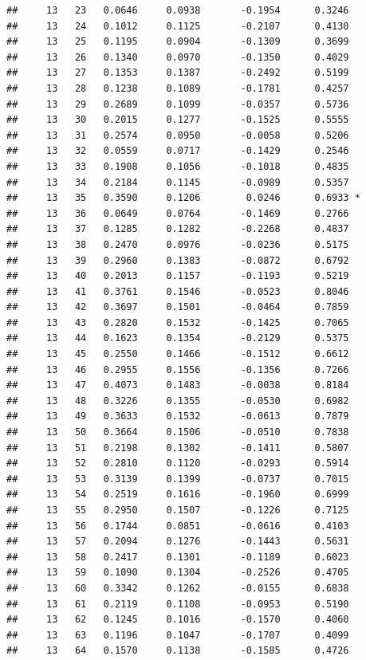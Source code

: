 \documentclass[
]{article}
\begin{document}
\begin{verbatim}
##     13   23   0.0646     0.0938       -0.1954      0.3246  
##     13   24   0.1012     0.1125       -0.2107      0.4130  
##     13   25   0.1195     0.0904       -0.1309      0.3699  
##     13   26   0.1340     0.0970       -0.1350      0.4029  
##     13   27   0.1353     0.1387       -0.2492      0.5199  
##     13   28   0.1238     0.1089       -0.1781      0.4257  
##     13   29   0.2689     0.1099       -0.0357      0.5736  
##     13   30   0.2015     0.1277       -0.1525      0.5555  
##     13   31   0.2574     0.0950       -0.0058      0.5206  
##     13   32   0.0559     0.0717       -0.1429      0.2546  
##     13   33   0.1908     0.1056       -0.1018      0.4835  
##     13   34   0.2184     0.1145       -0.0989      0.5357  
##     13   35   0.3590     0.1206        0.0246      0.6933 *
##     13   36   0.0649     0.0764       -0.1469      0.2766  
##     13   37   0.1285     0.1282       -0.2268      0.4837  
##     13   38   0.2470     0.0976       -0.0236      0.5175  
##     13   39   0.2960     0.1383       -0.0872      0.6792  
##     13   40   0.2013     0.1157       -0.1193      0.5219  
##     13   41   0.3761     0.1546       -0.0523      0.8046  
##     13   42   0.3697     0.1501       -0.0464      0.7859  
##     13   43   0.2820     0.1532       -0.1425      0.7065  
##     13   44   0.1623     0.1354       -0.2129      0.5375  
##     13   45   0.2550     0.1466       -0.1512      0.6612  
##     13   46   0.2955     0.1556       -0.1356      0.7266  
##     13   47   0.4073     0.1483       -0.0038      0.8184  
##     13   48   0.3226     0.1355       -0.0530      0.6982  
##     13   49   0.3633     0.1532       -0.0613      0.7879  
##     13   50   0.3664     0.1506       -0.0510      0.7838  
##     13   51   0.2198     0.1302       -0.1411      0.5807  
##     13   52   0.2810     0.1120       -0.0293      0.5914  
##     13   53   0.3139     0.1399       -0.0737      0.7015  
##     13   54   0.2519     0.1616       -0.1960      0.6999  
##     13   55   0.2950     0.1507       -0.1226      0.7125  
##     13   56   0.1744     0.0851       -0.0616      0.4103  
##     13   57   0.2094     0.1276       -0.1443      0.5631  
##     13   58   0.2417     0.1301       -0.1189      0.6023  
##     13   59   0.1090     0.1304       -0.2526      0.4705  
##     13   60   0.3342     0.1262       -0.0155      0.6838  
##     13   61   0.2119     0.1108       -0.0953      0.5190  
##     13   62   0.1245     0.1016       -0.1570      0.4060  
##     13   63   0.1196     0.1047       -0.1707      0.4099  
##     13   64   0.1570     0.1138       -0.1585      0.4726  

\end{verbatim}
\end{document}
